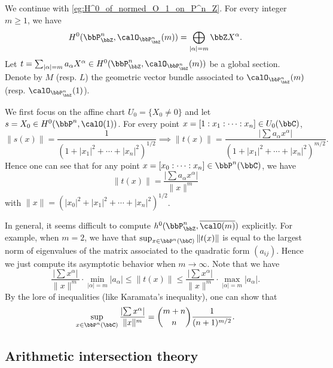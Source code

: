     \begin{example}\label{eg:volume_of_normed_O_1_on_P^n_Z}
        We continue with \cref{eg:H^0_of_normed_O_1_on_P^n_Z}.
        For every integer \(m \geq 1\), we have
        \[ H^0(\bbP^n_{\bbZ}, \calO_{\bbP^n_{\bbZ}}(m)) = \bigoplus_{|\alpha| = m} \bbZ X^\alpha. \]
        Let \(t = \sum_{|\alpha| = m} a_\alpha X^\alpha \in H^0(\bbP^n_{\bbZ}, \calO_{\bbP^n_{\bbZ}}(m))\) be a global section.
        Denote by \(M\) (resp. \(L\)) the geometric vector bundle associated to \(\calO_{\bbP^n_{\bbZ}}(m)\) (resp. \(\calO_{\bbP^n_{\bbZ}}(1)\)).
                
        We first focus on the affine chart \(U_0 = \{X_0 \neq 0\}\) and let \(s = X_0 \in H^0(\bbP^n, \calO(1))\).
        For every point \(x = [1: x_1: \cdots: x_n] \in U_0(\bbC)\), 
        \[ \|s(x)\| = \frac{1}{\left(1 + |x_1|^2 + \cdots + |x_n|^2\right)^{1/2}} \implies 
            \|t(x)\| = \frac{\left|\sum a_\alpha x^\alpha\right|}{\left(1 + |x_1|^2 + \cdots + |x_n|^2\right)^{m/2}}. \]
        Hence one can see that for any point \(x = [x_0:\cdots:x_n] \in \bbP^n(\bbC)\), we have 
        \[ \|t(x)\| = \frac{\left|\sum a_\alpha x^\alpha\right|}{\|x\|^m} \]
        with \(\|x\| = (|x_0|^2 + |x_1|^2 + \cdots + |x_n|^2)^{1/2}\).


        \Yang{}
        In general, it seems difficult to compute \(h^0(\bbP^n_\bbZ,\overline{\calO(m)})\) explicitly.
        For example, when \(m=2\), we have that \(\sup_{x \in \bbP^n(\bbC)} \|t(x)\|\) is equal to the largest norm of eigenvalues of the matrix associated to the quadratic form \((a_{ij})\).
        Hence we just compute its asymptotic behavior when \(m \to \infty\).
        Note that we have 
        \[ \frac{\left|\sum x^\alpha\right|}{\|x\|^m} \cdot \min_{|\alpha|=m} |a_\alpha| \leq \|t(x)\| \leq \frac{\left|\sum x^\alpha\right|}{\|x\|^m} \cdot \max_{|\alpha|=m} |a_\alpha|. \]
        By the lore of inequalities (like Karamata's inequality), one can show that
        \[ \sup_{x \in \bbP^n(\bbC)} \frac{\left|\sum x^\alpha\right|}{\|x\|^m} = \binom{m+n}{n} \frac{1}{(n+1)^{m/2}}. \]

    \end{example}


\subsection{Arithmetic intersection theory}